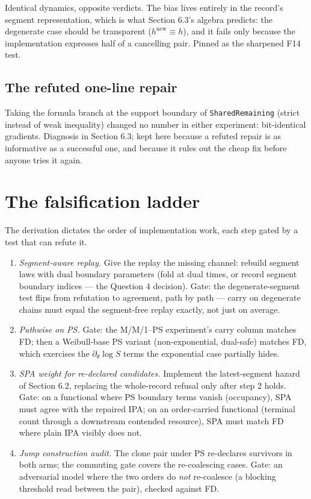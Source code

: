 \documentclass[11pt]{article}
\newcommand{\code}[1]{\texttt{#1}}
\begin{document}
Identical dynamics, opposite verdicts. The bias lives entirely in the
record's segment representation, which is what Section 6.3's algebra
predicts: the degenerate case should be transparent
($h^{\mathrm{new}} \equiv h$), and it fails only because the
implementation expresses half of a cancelling pair. Pinned as the
sharpened F14 test.

\subsection{The refuted one-line repair}

Taking the formula branch at the support boundary of
\code{SharedRemaining} (strict instead of weak inequality) changed no
number in either experiment: bit-identical gradients. Diagnosis in
Section 6.3; kept here because a refuted repair is as informative as a
successful one, and because it rules out the cheap fix before anyone
tries it again.

\section{The falsification ladder}

The derivation dictates the order of implementation work, each step
gated by a test that can refute it.

\begin{enumerate}
\item \emph{Segment-aware replay.} Give the replay the missing channel:
  rebuild segment laws with dual boundary parameters (fold at dual
  times, or record segment boundary indices --- the Question 4
  decision). Gate: the degenerate-segment test flips from refutation to
  agreement, path by path --- carry on degenerate chains must equal the
  segment-free replay exactly, not just on average.
\item \emph{Pathwise on PS.} Gate: the M/M/1--PS experiment's carry
  column matches FD; then a Weibull-base PS variant (non-exponential,
  dual-safe) matches FD, which exercises the $\partial_\theta \log S$
  terms the exponential case partially hides.
\item \emph{SPA weight for re-declared candidates.} Implement the
  latest-segment hazard of Section 6.2, replacing the whole-record
  refusal only after step 2 holds. Gate: on a functional where PS
  boundary terms vanish (occupancy), SPA must agree with the repaired
  IPA; on an order-carried functional (terminal count through a
  downstream contended resource), SPA must match FD where plain IPA
  visibly does not.
\item \emph{Jump construction audit.} The clone pair under PS re-declares
  survivors in both arms; the commuting gate covers the re-coalescing
  cases. Gate: an adversarial model where the two orders do \emph{not}
  re-coalesce (a blocking threshold read between the pair), checked
  against FD.
\end{enumerate}
\end{document}
